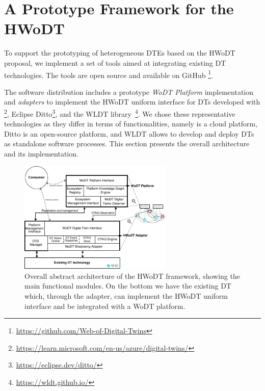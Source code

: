 \section{A Prototype Framework for the \acs{HWoDT}}
\label{sec:hwodt-impl}

To support the prototyping of heterogeneous \acp{DTE} based on the \ac{HWoDT} proposal, we implement a set of tools aimed at integrating existing \ac{DT} technologies.
%
The tools are open source and available on GitHub
\footnote{\url{https://github.com/Web-of-Digital-Twins}}. 

The software distribution includes a prototype \emph{\ac{WoDT} Platform} implementation and \emph{adapters} to implement the \ac{HWoDT} uniform interface for \acp{DT} developed with \azureTwin{}\footnote{\url{https://learn.microsoft.com/en-us/azure/digital-twins/}}, Eclipse Ditto\footnote{\url{https://eclipse.dev/ditto/}}, and the \ac{WLDT} library~\cite{picone2021wldt}\footnote{\url{https://wldt.github.io/}}.
We chose these representative technologies as they differ in terms of functionalities, namely \azureTwin{} is a cloud platform, Ditto is an open-source platform, and \ac{WLDT} allows to develop and deploy \acp{DT} as standalone software processes.
This section presents the overall architecture and its implementation.


\begin{figure}[ht]
  \centering
  \includegraphics[width=0.65\textwidth]{figures/hwodt/abstract_arch.pdf}
  \caption{Overall abstract architecture of the \ac{HWoDT} framework, showing the main functional modules. On the bottom we have the existing \ac{DT} which, through the adapter, can implement the \ac{HWoDT} uniform interface and be integrated with a \ac{WoDT} platform.}
  \label{fig:abstract_arch}
\end{figure}



